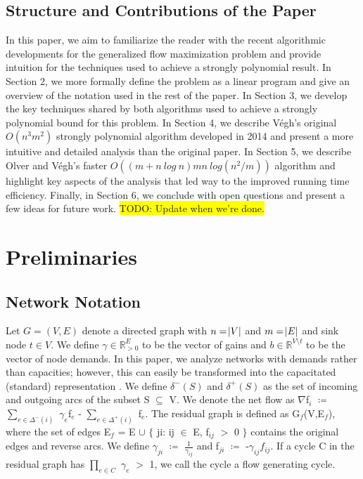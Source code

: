 \documentclass{article}
\newcommand{\todo}[1]{\colorbox{yellow}{TODO: #1}}
\begin{document}
	\subsection{Structure and Contributions of the Paper} In this paper, we aim to familiarize the reader with the recent algorithmic developments for the generalized flow maximization problem and provide intuition for the techniques used to achieve a strongly polynomial result. In Section 2, we more formally define the problem as a linear program and give an overview of the notation used in the rest of the paper. In Section 3, we develop the key techniques shared by both algorithms used to achieve a strongly polynomial bound for this problem. In Section 4, we describe Végh's original $O(n^3m^2)$ strongly polynomial algorithm developed in 2014 and present a more intuitive and detailed analysis than the original paper. In Section 5, we describe Olver and Végh's faster $O((m + n\ log\ n)mn\ log(n^2 / m))$ algorithm and highlight key aspects of the analysis that led way to the improved running time efficiency. Finally, in Section 6, we conclude with open questions and present a few ideas for future work. \todo{Update when we're done.}
    
\section{Preliminaries}

	\subsection{Network Notation}
    Let $G=(V,E)$ denote a directed graph with $n=\abs{V}$ and $m=\abs{E}$ and sink node $t \in V$. We define $\gamma \in \mathbb{R}_{>0}^E$ to be the vector of gains and $b \in \mathbb{R}^{V \setminus t}$ to be the vector of node demands. In this paper, we analyze networks with demands rather than capacities; however, this can easily be transformed into the capacitated (standard) representation \cite{Vegh2013}. We define $\delta^-(S)$ and $\delta^+(S)$ as the set of incoming and outgoing arcs of the subset S $\subseteq$ V. We denote the net flow as $\nabla$f$_i$ $\coloneqq$ $\sum_{e \in \Delta^-(i)}$ $\gamma_e$f$_e$ - $\sum_{e \in \Delta^+(i)}$ f$_e$. The residual graph is defined as G$_f$(V,E$_f$), where the set of edges E$_f$ = E $\cup$ $\{$ ji: ij $\in$ E, f$_{ij}$ $>$ 0 $\}$ contains the original edges and reverse arcs. We define $\gamma_{ji}$ $\coloneqq$ $\frac{1}{\gamma_{ij}}$ and f$_{ji}$ $\coloneqq$ -$\gamma_{ij}f_{ij}$. If a cycle C in the residual graph has $\prod_{e \in C}$ $\gamma_e$ $>$ 1, we call the cycle a flow generating cycle.
    
\end{document}
